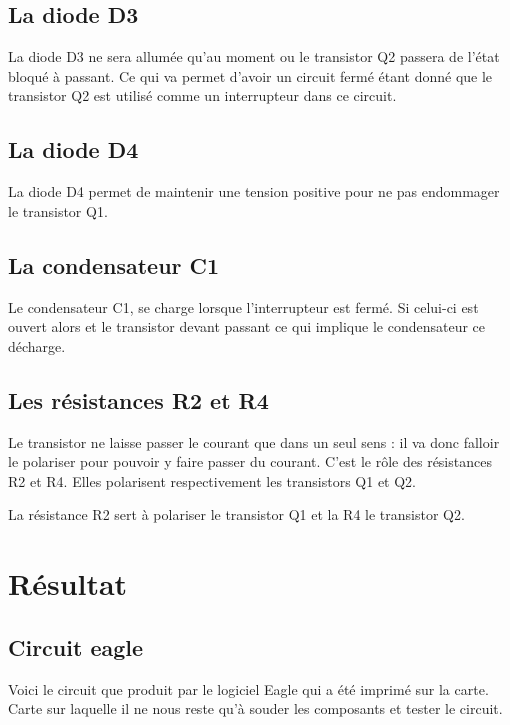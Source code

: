 \section{La diode D3}

La diode D3 ne sera allumée qu'au moment ou le transistor Q2 passera de l'état bloqué à passant. Ce qui va permet d'avoir un circuit fermé étant donné que le transistor Q2 est utilisé comme un interrupteur dans ce circuit.

\section{La diode D4}

La diode D4 permet de maintenir une tension positive pour ne pas endommager le transistor Q1.

\section{La condensateur C1}

Le condensateur C1, se charge lorsque l'interrupteur est fermé. Si celui-ci est ouvert alors et le transistor devant passant ce qui implique le condensateur ce décharge.

\section{Les résistances R2 et R4}

Le transistor ne laisse passer le courant que dans un seul sens : il va donc falloir le polariser pour pouvoir y faire passer du courant. C'est le rôle des résistances R2 et R4. Elles polarisent respectivement les transistors Q1 et Q2.

La résistance R2 sert à polariser le transistor Q1 et la R4 le transistor Q2.

\chapter{Résultat}


\section{Circuit eagle}

Voici le circuit que produit par le logiciel Eagle qui a été imprimé sur la carte. Carte sur laquelle il ne nous reste qu'à souder les composants et tester le circuit.


